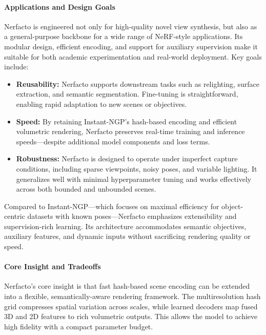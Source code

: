 \begin{enrichment}
\begin{enrichment}
    \paragraph{Applications and Design Goals}
    
    Nerfacto is engineered not only for high-quality novel view synthesis, but also as a general-purpose backbone for a wide range of NeRF-style applications. Its modular design, efficient encoding, and support for auxiliary supervision make it suitable for both academic experimentation and real-world deployment. Key goals include:
    
    \begin{itemize}
        \item \textbf{Reusability:} Nerfacto supports downstream tasks such as relighting, surface extraction, and semantic segmentation. Fine-tuning is straightforward, enabling rapid adaptation to new scenes or objectives.
        
        \item \textbf{Speed:} By retaining Instant-NGP’s hash-based encoding and efficient volumetric rendering, Nerfacto preserves real-time training and inference speeds—despite additional model components and loss terms.
        
        \item \textbf{Robustness:} Nerfacto is designed to operate under imperfect capture conditions, including sparse viewpoints, noisy poses, and variable lighting. It generalizes well with minimal hyperparameter tuning and works effectively across both bounded and unbounded scenes.
    \end{itemize}
    
    Compared to Instant-NGP—which focuses on maximal efficiency for object-centric datasets with known poses—Nerfacto emphasizes extensibility and supervision-rich learning. Its architecture accommodates semantic objectives, auxiliary features, and dynamic inputs without sacrificing rendering quality or speed.
    
    \paragraph{Core Insight and Tradeoffs}
    
    Nerfacto’s core insight is that fast hash-based scene encoding can be extended into a flexible, semantically-aware rendering framework. The multiresolution hash grid compresses spatial variation across scales, while learned decoders map fused 3D and 2D features to rich volumetric outputs. This allows the model to achieve high fidelity with a compact parameter budget.
    

\end{enrichment}
\end{enrichment}
